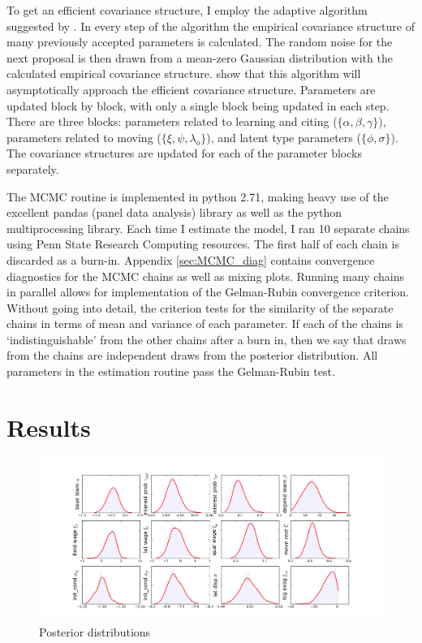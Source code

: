 To get an efficient covariance structure, I employ the adaptive
algorithm suggested by \citet{haario2001adaptive}. In every step of the
algorithm the empirical covariance structure of many previously accepted
parameters is calculated. The random noise for the next proposal is then
drawn from a mean-zero Gaussian distribution with the calculated
empirical covariance structure. \citet{haario2001adaptive} show that
this algorithm will asymptotically approach the efficient covariance
structure. Parameters are updated block by block, with only a single
block being updated in each step. There are three blocks: parameters
related to learning and citing ($\{\alpha,\beta,\gamma\}$), parameters
related to moving ($\{\xi,\psi,\lambda_o\}$), and latent type parameters
($\{\phi,\sigma\}$). The covariance structures are updated for each of
the parameter blocks separately.

The MCMC routine is implemented in python 2.71, making heavy use of the
excellent pandas (panel data analysis) library as well as
the python multiprocessing library. Each time I estimate the model, I ran 10 separate
chains using Penn State Research Computing resources.
The first half of each chain is discarded as a burn-in.
Appendix \ref{sec:MCMC_diag} contains convergence
diagnostics for the MCMC chains as well as mixing plots. Running many
chains in parallel allows for implementation of the Gelman-Rubin
convergence criterion.\citep{gelman1992inference} Without going into detail, the criterion tests
for the similarity of the separate chains in terms of mean and
variance of each parameter. If each of the chains is `indistinguishable'
from the other chains after a burn in, then we say that draws from the
chains are independent draws from the posterior distribution. All
parameters in the estimation routine pass the Gelman-Rubin test.

\section{Results}

\begin{figure}[!ht]
    \centering
    \includegraphics[scale=0.35]{pics/params_dists_big.png}
    \caption{Posterior distributions}
    \label{fig:big_params}
\end{figure}

